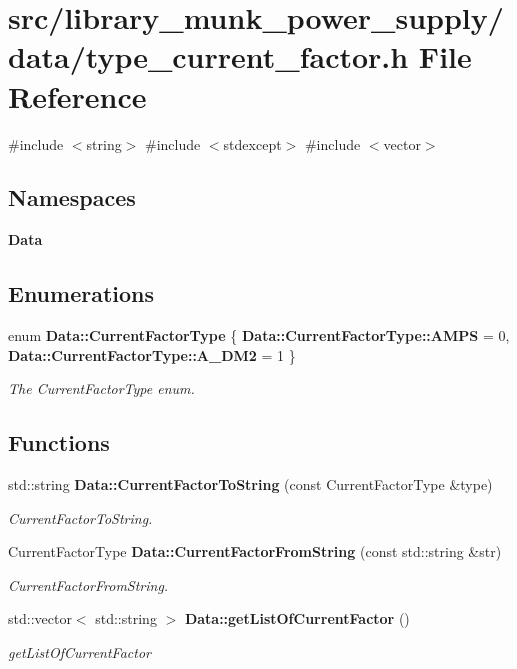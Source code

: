 \section{src/library\+\_\+munk\+\_\+power\+\_\+supply/data/type\+\_\+current\+\_\+factor.h File Reference}
\label{type__current__factor_8h}
{\ttfamily \#include $<$string$>$}\newline
{\ttfamily \#include $<$stdexcept$>$}\newline
{\ttfamily \#include $<$vector$>$}\newline
\subsection*{Namespaces}
\begin{DoxyCompactItemize}
\item 
 \textbf{ Data}
\end{DoxyCompactItemize}
\subsection*{Enumerations}
\begin{DoxyCompactItemize}
\item 
enum \textbf{ Data\+::\+Current\+Factor\+Type} \{ \textbf{ Data\+::\+Current\+Factor\+Type\+::\+A\+M\+PS} = 0, 
\textbf{ Data\+::\+Current\+Factor\+Type\+::\+A\+\_\+\+D\+M2} = 1
 \}\begin{DoxyCompactList}\small\item\em The Current\+Factor\+Type enum. \end{DoxyCompactList}
\end{DoxyCompactItemize}
\subsection*{Functions}
\begin{DoxyCompactItemize}
\item 
std\+::string \textbf{ Data\+::\+Current\+Factor\+To\+String} (const Current\+Factor\+Type \&type)
\begin{DoxyCompactList}\small\item\em Current\+Factor\+To\+String. \end{DoxyCompactList}\item 
Current\+Factor\+Type \textbf{ Data\+::\+Current\+Factor\+From\+String} (const std\+::string \&str)
\begin{DoxyCompactList}\small\item\em Current\+Factor\+From\+String. \end{DoxyCompactList}\item 
std\+::vector$<$ std\+::string $>$ \textbf{ Data\+::get\+List\+Of\+Current\+Factor} ()
\begin{DoxyCompactList}\small\item\em get\+List\+Of\+Current\+Factor \end{DoxyCompactList}\end{DoxyCompactItemize}
